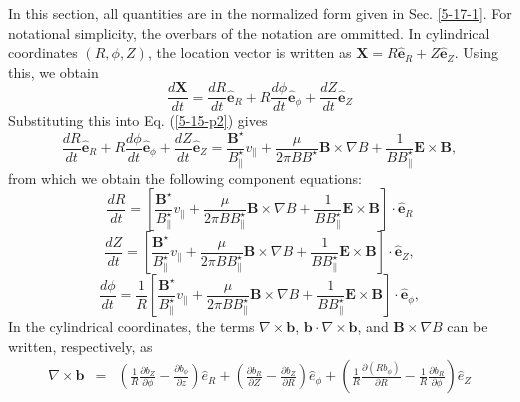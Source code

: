 \documentclass{article}
\begin{document}
In this section, all quantities are in the normalized form given in Sec.
\ref{5-17-1}. For notational simplicity, the overbars of the notation are
ommitted. In cylindrical coordinates $(R, \phi, Z)$, the location vector is
written as $\mathbf{X}= R \hat{\mathbf{e}}_R + Z \hat{\mathbf{e}}_Z$. Using
this, we obtain
\begin{equation}
  \frac{d\mathbf{X}}{d t} = \frac{d R}{d t} \hat{\mathbf{e}}_R + R \frac{d
  \phi}{d t} \hat{\mathbf{e}}_{\phi} + \frac{d Z}{d t} \hat{\mathbf{e}}_Z
\end{equation}
Substituting this into Eq. (\ref{5-15-p2}) gives
\begin{equation}
  \frac{d R}{d t} \hat{\mathbf{e}}_R + R \frac{d \phi}{d t}
  \hat{\mathbf{e}}_{\phi} + \frac{d Z}{d t} \hat{\mathbf{e}}_Z =
  \frac{\mathbf{B}^{\star}}{B^{\star}_{\parallel}} v_{\parallel} +
  \frac{\mu}{2 \pi B B^{\star}} \mathbf{B} \times \nabla B + \frac{1}{B
  B^{\star}_{\parallel}} \mathbf{E} \times \mathbf{B},
\end{equation}
from which we obtain the following component equations:
\begin{equation}
  \frac{d R}{d t} = \left[ \frac{\mathbf{B}^{\star}}{B^{\star}_{\parallel}}
  v_{\parallel} + \frac{\mu}{2 \pi B B^{\star}_{\parallel}} \mathbf{B} \times
  \nabla B + \frac{1}{B B_{\parallel}^{\star}} \mathbf{E} \times \mathbf{B}
  \right] \cdot \hat{\mathbf{e}}_R
\end{equation}
\begin{equation}
  \frac{d Z}{d t} = \left[ \frac{\mathbf{B}^{\star}}{B^{\star}_{\parallel}}
  v_{\parallel} + \frac{\mu}{2 \pi B B^{\star}_{\parallel}} \mathbf{B} \times
  \nabla B + \frac{1}{B B_{\parallel}^{\star}} \mathbf{E} \times \mathbf{B}
  \right] \cdot \hat{\mathbf{e}}_Z,
\end{equation}
\begin{equation}
  \frac{d \phi}{d t} = \frac{1}{R} \left[
  \frac{\mathbf{B}^{\star}}{B^{\star}_{\parallel}} v_{\parallel} +
  \frac{\mu}{2 \pi B B^{\star}_{\parallel}} \mathbf{B} \times \nabla B +
  \frac{1}{B B_{\parallel}^{\star}} \mathbf{E} \times \mathbf{B} \right] \cdot
  \hat{\mathbf{e}}_{\phi},
\end{equation}
In the cylindrical coordinates, the terms $\nabla \times \mathbf{b}$,
$\mathbf{b} \cdot \nabla \times \mathbf{b}$, and $\mathbf{B} \times \nabla B$
can be written, respectively, as
\begin{eqnarray}
  \nabla \times \mathbf{b} & = & \left( \frac{1}{R}  \frac{\partial
  b_Z}{\partial \phi} - \frac{\partial b_{\phi}}{\partial z} \right) \hat{e}_R
  + \left(  \frac{\partial b_R}{\partial Z} - \frac{\partial b_Z}{\partial R}
  \right) \hat{e}_{\phi} + \left( \frac{1}{R}  \frac{\partial (R
  b_{\phi})}{\partial R} - \frac{1}{R}  \frac{\partial b_R}{\partial \phi}
  \right) \hat{e}_Z 
\end{eqnarray}
\end{document}
